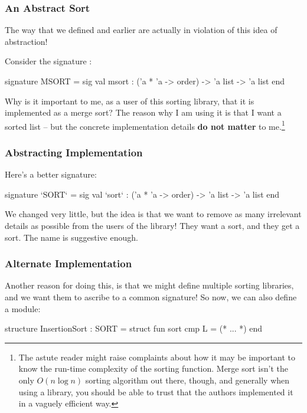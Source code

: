 \documentclass[aspectratio=169, handout]{beamer}
\begin{document}
\begin{frame}[fragile]
  \frametitle{An Abstract Sort}

  The way that we defined  and  earlier are actually
  in violation of this idea of abstraction!

  \pause
  \vspace{\fill}

  Consider the signature :

  \begin{codeblock}
    signature MSORT =
      sig
        val msort : ('a * 'a -> order) -> 'a list -> 'a list
      end
  \end{codeblock}

  \pause
  \vspace{\fill}

  Why is it important to me, as a user of this sorting library, that it
  is implemented as a merge sort? The reason why I am using it is that I
  want a sorted list -- but the concrete implementation details
  \textbf{do not matter} to me.\footnote{The astute reader might raise complaints about how it
  may be important to know the run-time complexity of the sorting function.
  Merge sort isn't the only $O(n \log n)$ sorting algorithm out there, though,
  and generally when using a library, you should be able to trust that the
  authors implemented it in a vaguely efficient way.}
\end{frame}

\begin{frame}[fragile]
  \frametitle{Abstracting Implementation}

  Here's a better signature:

  \begin{codeblock}
    signature `SORT` =
      sig
        val `sort` : ('a * 'a -> order) -> 'a list -> 'a list
      end
  \end{codeblock}

  \pause
  \vspace{\fill}

  We changed very little, but the idea is that we want to remove as many irrelevant
  details as possible from the users of the library! They want a sort, and they
  get a sort. The name is suggestive enough.
\end{frame}

\begin{frame}[fragile]
  \frametitle{Alternate Implementation}

  Another reason for doing this, is that we might define multiple sorting libraries,
  and we want them to ascribe to a common signature! So now, we can also define a
   module:

  \pause
  \vspace{\fill}

  \begin{codeblock}
    structure InsertionSort : SORT =
      struct
        fun sort cmp L = (* ... *)
      end
  \end{codeblock}
\end{frame}
\end{document}
